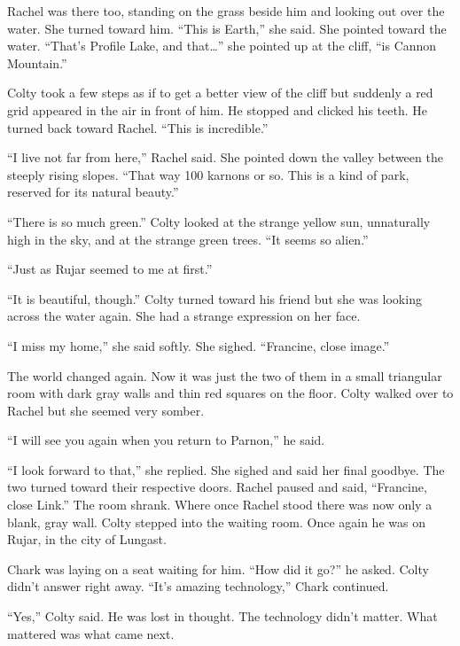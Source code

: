 Rachel was there too, standing on the grass beside him and looking out over the water. She
turned toward him. ``This is Earth,'' she said. She pointed toward the water. ``That's Profile
Lake, and that\ldots'' she pointed up at the cliff, ``is Cannon Mountain.''

Colty took a few steps as if to get a better view of the cliff but suddenly a red grid appeared
in the air in front of him. He stopped and clicked his teeth. He turned back toward Rachel.
``This is incredible.''

``I live not far from here,'' Rachel said. She pointed down the valley between the steeply
rising slopes. ``That way 100 karnons or so. This is a kind of park, reserved for its natural
beauty.''

``There is so much green.'' Colty looked at the strange yellow sun, unnaturally high in the sky,
and at the strange green trees. ``It seems so alien.''

``Just as Rujar seemed to me at first.''

``It is beautiful, though.'' Colty turned toward his friend but she was looking across the water
again. She had a strange expression on her face.

``I miss my home,'' she said softly. She sighed. ``Francine, close image.''

The world changed again. Now it was just the two of them in a small triangular room with dark
gray walls and thin red squares on the floor. Colty walked over to Rachel but she seemed very
somber.

``I will see you again when you return to Parnon,'' he said.

``I look forward to that,'' she replied. She sighed and said her final goodbye. The two turned
toward their respective doors. Rachel paused and said, ``Francine, close Link.'' The room
shrank. Where once Rachel stood there was now only a blank, gray wall. Colty stepped into the
waiting room. Once again he was on Rujar, in the city of Lungast.

Chark was laying on a seat waiting for him. ``How did it go?'' he asked. Colty didn't answer
right away. ``It's amazing technology,'' Chark continued.

``Yes,'' Colty said. He was lost in thought. The technology didn't matter. What mattered was
what came next.
